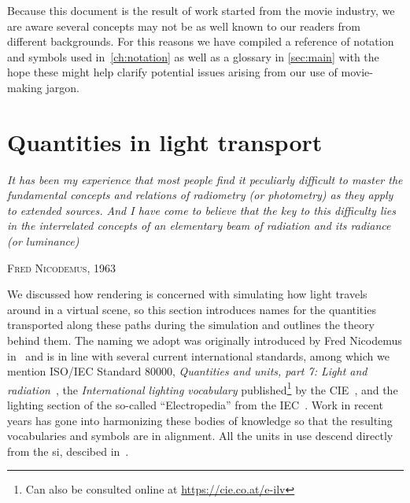 Because this document is the result of work started from the movie industry, 
we are aware several concepts may not be as well known to our readers from different backgrounds. 
For this reasons we have compiled a reference of notation and symbols used in~\cref{ch:notation} 
as well as a glossary in \cref{sec:main} with the hope these might help clarify potential issues arising 
from our use of movie-making jargon.

\section{Quantities in light transport}
\epigraph{%
	\emph{It has been	my experience that most people find it peculiarly difficult to master 
	the fundamental concepts and relations of radiometry (or photometry) as they apply 
	to extended sources. And I have come to believe that the key to this difficulty 
	lies in the interrelated concepts of an elementary beam of radiation and its 
	radiance (or luminance)}}{\textsc{Fred Nicodemus}, 1963}

\noindent We discussed how \gls{rendering} is concerned with simulating how light travels around in 
a \gls{virtual scene}, so this section introduces names for the quantities transported 
along these paths during the simulation and outlines the theory behind them. 
The naming we adopt was originally introduced by Fred Nicodemus in~\cite{nicodemus77} and
is in line with several current international standards,  
among which we mention \gls{ISO}/\gls{IEC} Standard 80000, 
\emph{Quantities and units, part 7: Light and radiation}~\cite{iso:80000-7:2019}, 
the \emph{International lighting vocabulary} published\footnote{Can also be consulted 
	online at \url{https://cie.co.at/e-ilv}} by the \gls{CIE}~\cite{cie:s017.2020},
and the lighting section of the so-called ``Electropedia'' from the \gls{IEC}~\cite{iec:60050-845:2020}.
Work in recent years has gone into harmonizing these bodies of knowledge so that the resulting 
vocabularies and symbols are in alignment. All the units in use descend directly
from the \gls{si}, descibed in~\cite{bipm:si.2019}.

